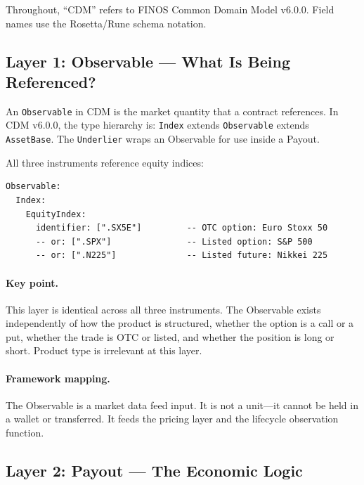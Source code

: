 \documentclass[11pt,a4paper]{article}
\begin{document}
\noindent Throughout, ``CDM'' refers to FINOS Common Domain Model v6.0.0. Field names use the Rosetta/Rune schema notation.
\subsection{Layer 1: Observable --- What Is Being Referenced?}
\label{sec:cdm-observable}

An \texttt{Observable} in CDM is the market quantity that a contract references. In CDM v6.0.0, the type hierarchy is: \texttt{Index} extends \texttt{Observable} extends \texttt{AssetBase}. The \texttt{Underlier} wraps an Observable for use inside a Payout.

All three instruments reference equity indices:

\begin{lstlisting}
Observable:
  Index:
    EquityIndex:
      identifier: [".SX5E"]         -- OTC option: Euro Stoxx 50
      -- or: [".SPX"]               -- Listed option: S&P 500
      -- or: [".N225"]              -- Listed future: Nikkei 225
\end{lstlisting}

\paragraph{Key point.} This layer is identical across all three instruments. The Observable exists independently of how the product is structured, whether the option is a call or a put, whether the trade is OTC or listed, and whether the position is long or short. Product type is irrelevant at this layer.

\paragraph{Framework mapping.} The Observable is a market data feed input. It is not a unit---it cannot be held in a wallet or transferred. It feeds the pricing layer and the lifecycle observation function.

\subsection{Layer 2: Payout --- The Economic Logic}
\label{sec:cdm-payout}
\end{document}
